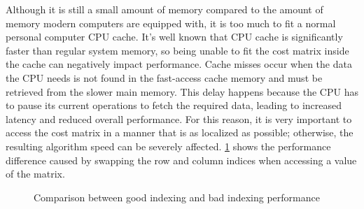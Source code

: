 Although it is still a small amount of memory compared to the amount of memory modern computers are equipped with, it is too much to fit a normal personal computer CPU cache.
It's well known that CPU cache is significantly faster than regular system memory, so being unable to fit the cost matrix inside the cache can negatively impact performance.
Cache misses occur when the data the CPU needs is not found in the fast-access cache memory and must be retrieved from the slower main memory.
This delay happens because the CPU has to pause its current operations to fetch the required data, leading to increased latency and reduced overall performance.
For this reason, it is very important to access the cost matrix in a manner that is as localized as possible; otherwise, the resulting algorithm speed can be severely affected.
\figurename{ \ref{fig:matrixBadIndex}} shows the performance difference caused by swapping the row and column indices when accessing a value of the matrix.

\begin{figure}[H]
    \centering
    \caption{Comparison between good indexing and bad indexing performance} \label{fig:matrixBadIndex}
\end{figure}

